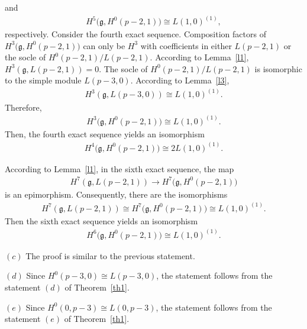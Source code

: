 \documentclass[10pt,a4paper]{amsart}
\numberwithin{equation}{section}
\begin{document}
and
\begin{gather*}
H^5\big(\mathfrak{g},H^0(p-2,1)\big)\cong L(1,0)^{(1)},
\end{gather*}
respectively.
Consider the fourth exact sequence. Composition factors of $H^3\big(\mathfrak{g},H^0(p-2,1)\big)$ can only be $H^3$ with coefficients in either $L(p-2,1)$ or the socle of $H^0(p-2,1)/L(p-2,1)$.
According to Lemma~\ref{l1}, $H^3(\mathfrak{g},L(p-2,1))=0$. The socle of $H^0(p-2,1)/L(p-2,1)$ is isomorphic to the simple module $L(p-3,0)$. According to Lemma~\ref{l3},
\begin{gather*}
H^3(\mathfrak{g},L(p-3,0))\cong L(1,0)^{(1)}.
\end{gather*}
Therefore,
\begin{gather*}
H^3\big(\mathfrak{g},H^0(p-2,1)\big)\cong L(1,0)^{(1)}.
\end{gather*}
Then, the fourth exact sequence yields an isomorphism
\begin{gather*}
H^4\big(\mathfrak{g},H^0(p-2,1)\big)\cong 2L(1,0)^{(1)}.
\end{gather*}

According to Lemma~\ref{l1}, in the sixth exact sequence, the map
\begin{gather*}
H^7(\mathfrak{g},L(p-2,1))\longrightarrow
H^7\big(\mathfrak{g},H^0(p-2,1)\big)
\end{gather*}
is an epimorphism. Consequently, there are the isomorphisms
\begin{gather*}
H^7(\mathfrak{g},L(p-2,1))\cong
H^7\big(\mathfrak{g},H^0(p-2,1)\big)\cong L(1,0)^{(1)}.
\end{gather*}
Then the sixth exact sequence yields an isomorphism
\begin{gather*}
H^6\big(\mathfrak{g},H^0(p-2,1)\big)\cong L(1,0)^{(1)}.
\end{gather*}

$(c)$ The proof is similar to the previous statement.

$(d)$ Since $H^0(p-3,0)\cong L(p-3,0)$, the statement follows from the statement $(d)$ of Theorem~\ref{th1}.

$(e)$ Since $H^0(0,p-3)\cong L(0,p-3)$, the statement follows from the statement $(e)$ of Theorem~\ref{th1}.
\end{document}
